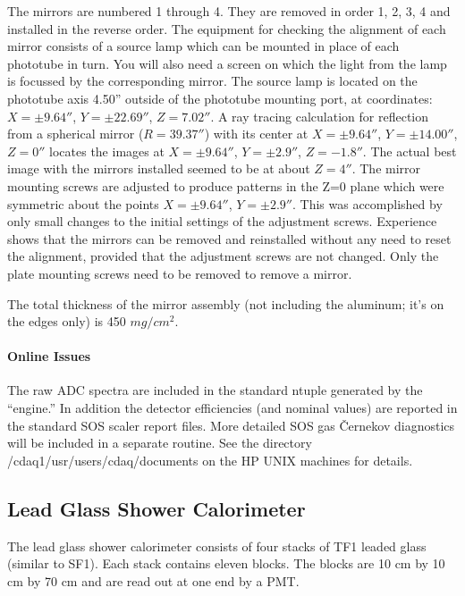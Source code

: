 \begin{obsolete}
	The mirrors are numbered 1 through 4.  They are removed in
order 1, 2, 3, 4 and installed in the reverse order.  The equipment
for checking the alignment of each mirror consists of a source lamp
which can be mounted in place of each phototube in turn.  You will
also need a screen on which the light from the lamp is focussed by the
corresponding mirror.  The source lamp is located on the phototube
axis 4.50'' outside of the phototube mounting port, at coordinates:
$X = \pm9.64''$, $Y = \pm22.69''$, $Z = 7.02''$.  A ray tracing
calculation for reflection from a spherical mirror ($R = 39.37''$)
with its center at $X = \pm9.64''$, $Y = \pm14.00''$, $Z = 0''$
locates the images at $X = \pm9.64''$, $Y = \pm2.9''$, $Z = -1.8''$.
The actual best image with the mirrors installed seemed to be at about
$Z = 4''$.  The mirror mounting screws are adjusted to produce
patterns in the Z=0 plane which were symmetric about the points $X =
\pm9.64''$, $Y = \pm2.9''$.  This was accomplished by only small
changes to the initial settings of the adjustment screws.  Experience
shows that the mirrors can be removed and reinstalled without any need
to reset the alignment, provided that the adjustment screws are not
changed.  Only the plate mounting screws need to be removed to remove
a mirror.

	The total thickness of the mirror assembly (not including the
aluminum; it's on the edges only) is 450 $mg/cm^{2}$.

\paragraph{Online Issues}

	The raw ADC spectra are included in the standard ntuple
generated by the ``engine.''  In addition the detector efficiencies
(and nominal values) are reported in the standard SOS scaler report
files.  More detailed SOS gas \v{C}ernekov diagnostics will be
included in a separate routine.  See the directory
/cdaq1/usr/users/cdaq/documents on the HP UNIX machines for details.


\subsection{Lead Glass Shower Calorimeter }

The lead glass shower calorimeter consists of four stacks of
TF1 leaded glass (similar to SF1). Each stack contains eleven
blocks. The blocks are 10 cm by 10 cm by 70 cm and are read
out at one end by a PMT.


\end{obsolete}
